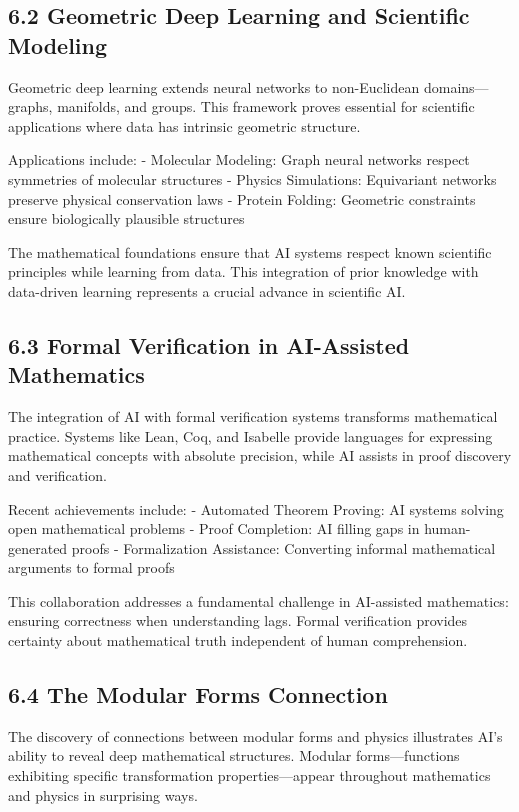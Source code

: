 \documentclass{article}
\begin{document}
\subsection{6.2 Geometric Deep Learning and Scientific Modeling}

Geometric deep learning extends neural networks to non-Euclidean domains—graphs, manifolds, and groups. This framework proves essential for scientific applications where data has intrinsic geometric structure.


Applications include:
- Molecular Modeling: Graph neural networks respect symmetries of molecular structures
- Physics Simulations: Equivariant networks preserve physical conservation laws
- Protein Folding: Geometric constraints ensure biologically plausible structures


The mathematical foundations ensure that AI systems respect known scientific principles while learning from data. This integration of prior knowledge with data-driven learning represents a crucial advance in scientific AI.


\subsection{6.3 Formal Verification in AI-Assisted Mathematics}

The integration of AI with formal verification systems transforms mathematical practice. Systems like Lean, Coq, and Isabelle provide languages for expressing mathematical concepts with absolute precision, while AI assists in proof discovery and verification.


Recent achievements include:
- Automated Theorem Proving: AI systems solving open mathematical problems
- Proof Completion: AI filling gaps in human-generated proofs
- Formalization Assistance: Converting informal mathematical arguments to formal proofs


This collaboration addresses a fundamental challenge in AI-assisted mathematics: ensuring correctness when understanding lags. Formal verification provides certainty about mathematical truth independent of human comprehension.


\subsection{6.4 The Modular Forms Connection}

The discovery of connections between modular forms and physics illustrates AI's ability to reveal deep mathematical structures. Modular forms—functions exhibiting specific transformation properties—appear throughout mathematics and physics in surprising ways.
\end{document}
